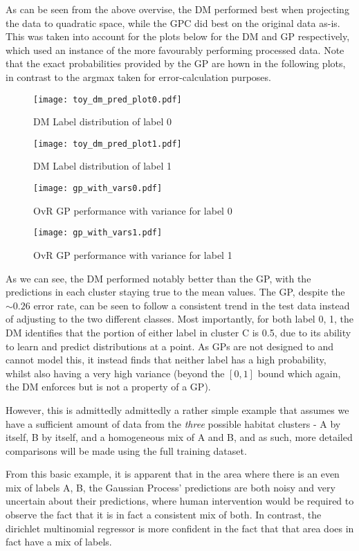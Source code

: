 As can be seen from the above overvise, the DM performed best when projecting the data to quadratic space, while the GPC did best on the original data as-is. This was taken into account for the plots below for the DM and GP respectively, which used an instance of the more favourably performing processed data. Note that the exact probabilities provided by the GP are hown in the following plots, in contrast to the argmax taken for error-calculation purposes. 

\begin{figure}[H]
    \texttt{[image: toy\_dm\_pred\_plot0.pdf]}
    \caption{DM Label distribution of label 0}
    \label{fig:toylabel0}
\end{figure}
\begin{figure}[H]
    \texttt{[image: toy\_dm\_pred\_plot1.pdf]}
    \caption{DM Label distribution of label 1}
    \label{fig:toylabel1}
\end{figure} 

\begin{figure}[H]
    \texttt{[image: gp\_with\_vars0.pdf]}
    \caption{OvR GP performance with variance for label 0}
    \label{fig:toylabel0}
\end{figure}
\begin{figure}[H]
    \texttt{[image: gp\_with\_vars1.pdf]}
    \caption{OvR GP performance with variance for label 1}
    \label{fig:toylabel1}
\end{figure} 

As we can see, the DM performed notably better than the GP, with the predictions in each cluster staying true to the mean values. The GP, despite the $\sim 0.26$ error rate, can be seen to follow a consistent trend in the test data instead of adjusting to the two different classes. Most importantly, for both label 0, 1, the DM identifies that the portion of either label in cluster C is 0.5, due to its ability to learn and predict distributions at a point. As GPs are not designed to and cannot model this, it instead finds that neither label has a high probability, whilst also having a very high variance (beyond the $[0, 1]$ bound which again, the DM enforces but is not a property of a GP).

However, this is admittedly admittedly a rather simple example that assumes we have a sufficient amount of data from the \textit{three} possible habitat clusters - A by itself, B by itself, and a homogeneous mix of A and B, and as such, more detailed comparisons will be made using the full training dataset.

From this basic example, it is apparent that in the area where there is an even mix of labels A, B, the Gaussian Process' predictions are both noisy and very uncertain about their predictions, where human intervention would be required to observe the fact that it is in fact a consistent mix of both. In contrast, the dirichlet multinomial regressor is more confident in the fact that that area does in fact have a mix of labels.
